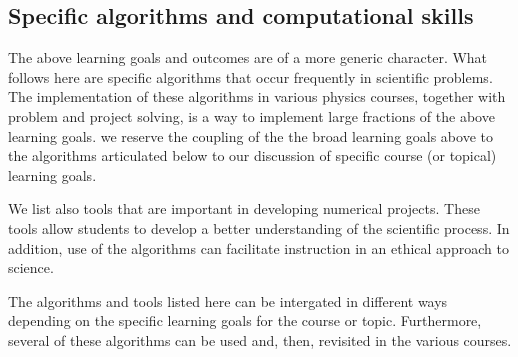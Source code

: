 \documentclass[%
oneside,                 %
final,                   %
10pt]{article}
\begin{document}
\noindent
\subsection*{Specific algorithms and computational skills}

The above learning goals and outcomes are of a more generic character. What follows here are specific
algorithms that occur frequently in scientific problems. The implementation of these algorithms in various physics courses, together with problem and project solving, is a way to implement large fractions of the above learning goals. we reserve the coupling of the the broad learning goals above to the algorithms articulated below to our discussion of specific course (or topical) learning goals.

We list also tools that are important in developing
numerical projects. These tools allow students to develop a better understanding of the scientific process. In addition, use of the algorithms can facilitate instruction in an ethical approach to science.

The algorithms and tools listed here can be intergated in different ways depending on the specific learning goals for the course or topic. Furthermore, several of these algorithms can be used and, then, revisited in the various courses.
\end{document}

